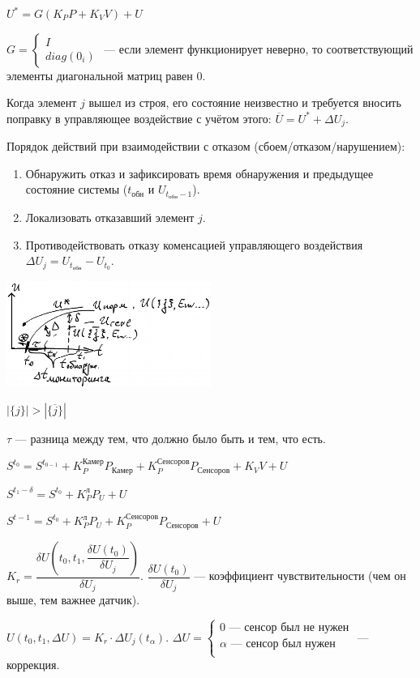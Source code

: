 \documentclass[a4paper]{article}
\begin{document}
$U^* = G(K_PP + K_VV) + U$

$G = \begin{cases}I \\ diag(0_i)\end{cases}$ — если элемент функционирует неверно, то соответствующий элементы диагональной матриц равен $0$.

Когда элемент $j$ вышел из строя, его состояние неизвестно и требуется вносить поправку в управляющее воздействие с учётом этого: $\overline{U} = U^* + \Delta U_j$.

Порядок действий при взаимодействии с отказом (сбоем/отказом/нарушением):
\begin{enumerate}
    \item Обнаружить отказ и зафиксировать время обнаружения и предыдущее состояние системы ($t_\text{обн}$ и $U_{t_\text{обн} - 1}$).
    \item Локализовать отказавший элемент $j$.
    \item Противодействовать отказу коменсацией управляющего воздействия $\Delta U_j = U_{t_\text{обн}} - U_{t_0}$.
\end{enumerate}

\includegraphics[width=0.5\textwidth]{graphics/pic02.jpg}

$|\{j\}| > |\{\overline{j}\}|$

$\tau$ — разница между тем, что должно было быть и тем, что есть.

$S^{t_0} = S^{t_{0-1}} + K_P^\text{Камер}P_\text{Камер} + K_P^\text{Сенсоров}P_\text{Сенсоров} + K_VV + U$

$S^{t_1 - \delta} = S^{t_0} + K_P^\text{л}P_U + U$

$S^{t-1} = S^{t_0} + K_P^\text{л}P_U + K_P^\text{Сенсоров}P_\text{Сенсоров} + U$

$K_r = \dfrac{\delta U(t_0, t_1, \dfrac{\delta U(t_0)}{\delta U_j})}{\delta U_j}$. $\dfrac{\delta U(t_0)}{\delta U_j}$ — коэффициент чувствительности (чем он выше, тем важнее датчик).

$U(t_0, t_1, \Delta U) = K_r \cdot \Delta U_j(t_\alpha)$. $\Delta U = \begin{cases}
        0 \text{ — сенсор был не нужен}   \\
        \alpha \text{ — сенсор был нужен} \\
    \end{cases}$ — коррекция.
\end{document}
